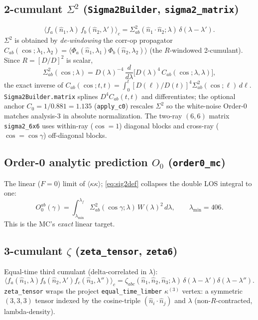 \documentclass[11pt]{article}
\newcommand{\code}[1]{\texttt{#1}}
\newcommand{\lam}{\lambda}
\newcommand{\lamf}{\lambda_f}
\newcommand{\Sig}{\Sigma^{2}}
\newcommand{\nh}{\hat{n}}
\newcommand{\D}{D}
\begin{document}
\subsection{2-cumulant $\Sig$ \quad(\code{Sigma2Builder}, \code{sigma2\_matrix})}
\begin{equation}
\langle f_a(\nh_1,\lam)\,f_b(\nh_2,\lam')\rangle_c
=\Sig_{ab}(\nh_1\!\cdot\!\nh_2;\lam)\,\delta(\lam-\lam').
\label{eq:sig2def}
\end{equation}
$\Sig$ is obtained by \emph{de-windowing} the corr-op propagator
$C_{ab}(\cos;\lam_1,\lam_2)=\langle\Phi_a(\nh_1,\lam_1)\Phi_b(\nh_2,\lam_2)\rangle$
(the $R$-windowed 2-cumulant). Since $R=[\D/\D]^2$ is scalar,
\begin{equation}
\Sig_{ab}(\cos;\lam)=\D(\lam)^{-4}\,\frac{d}{d\lam}
\bigl[\D(\lam)^4\,C_{ab}(\cos;\lam,\lam)\bigr],
\label{eq:dewindow}
\end{equation}
the exact inverse of $C_{ab}(\cos;t,t)=\int_0^t[\D(\ell)/\D(t)]^4\Sig_{ab}(\cos;\ell)\,d\ell$.
\code{Sigma2Builder.matrix} splines $\D^4 C_{ab}(t,t)$ and differentiates; the
optional anchor $C_0=1/0.881=1.135$ (\code{apply\_c0}) rescales $\Sig$ so the
white-noise Order-0 matches analysis-3 in absolute normalization. The two-ray
$(6,6)$ matrix \code{sigma2\_6x6} uses within-ray ($\cos{=}1$) diagonal blocks and
cross-ray ($\cos{=}\cos\gamma$) off-diagonal blocks.

\subsection{Order-0 analytic prediction $O_0$ \quad(\code{order0\_mc})}
The linear ($F{=}0$) limit of $\langle\kappa\kappa\rangle$; \eqref{eq:sig2def}
collapses the double LOS integral to one:
\begin{equation}
O_0^{ab}(\gamma)=\int_{\lam_{\min}}^{\lamf}\Sig_{ab}(\cos\gamma;\lam)\,W(\lam)^2\,d\lam ,
\qquad \lam_{\min}=406 .
\label{eq:O0}
\end{equation}
This is the MC's \emph{exact} linear target.

\subsection{3-cumulant $\zeta$ \quad(\code{zeta\_tensor}, \code{zeta6})}
Equal-time third cumulant (delta-correlated in $\lam$):
\begin{equation}
\langle f_a(\nh_1,\lam)f_b(\nh_2,\lam')f_c(\nh_3,\lam'')\rangle_c
=\zeta_{abc}(\nh_1,\nh_2,\nh_3;\lam)\,\delta(\lam-\lam')\delta(\lam-\lam'').
\label{eq:zeta}
\end{equation}
\code{zeta\_tensor} wraps the project \code{equal\_time\_limber} $\kappa^{(3)}$
vertex: a symmetric $(3,3,3)$ tensor indexed by the cosine-triple
$(\nh_i\!\cdot\!\nh_j)$ and $\lam$ (non-$R$-contracted, lambda-density).
\end{document}

